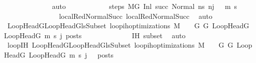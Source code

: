 \begin{isabellebody}
\ \ \ \ \ \ \ \ \ \ \ \ \isamarkupfalse%
\ auto\isanewline
\ \ \ \ \ \ \ \ \ \ \isamarkupfalse%
\ steps{\isacharcolon}{\kern0pt}\ {\isachardoublequoteopen}M{\isacharcomma}{\kern0pt}{\isasymLambda}{\isacharcomma}{\kern0pt}{\isasymGamma}{\isacharcomma}{\kern0pt}{\isasymOmega}{\isacharcomma}{\kern0pt}G\ {\isasymturnstile}{\isacharparenleft}{\kern0pt}Inl\ succ{\isacharcomma}{\kern0pt}\ Normal\ ns{\isacharprime}{\kern0pt}{\isacharparenright}{\kern0pt}\ {\isacharminus}{\kern0pt}n{\isasymrightarrow}{\isacharcircum}{\kern0pt}{\isacharparenleft}{\kern0pt}j\ {\isacharminus}{\kern0pt}\ {}{\isacharparenright}{\kern0pt}\ {\isacharparenleft}{\kern0pt}m{\isacharprime}{\kern0pt}{\isacharcomma}{\kern0pt}\ s{\isacharprime}{\kern0pt}{\isacharparenright}{\kern0pt}{\isachardoublequoteclose}\isanewline
\ \ \ \ \ \ \ \ \ \ \ \ \isamarkupfalse%
\ {\isachardoublequoteopen}{}{\isachardoublequoteclose}{\isacharparenleft}{\kern0pt}{}{\isacharparenright}{\kern0pt}\ {\isachardoublequoteopen}{}{\isachardoublequoteclose}{\isacharparenleft}{\kern0pt}{}{\isacharparenright}{\kern0pt}\ local{\isachardot}{\kern0pt}RedNormalSucc{\isacharparenleft}{\kern0pt}{}{\isacharparenright}{\kern0pt}\ local{\isachardot}{\kern0pt}RedNormalSucc{\isacharparenleft}{\kern0pt}{}{\isacharparenright}{\kern0pt}\ \isamarkupfalse%
\ auto\isanewline
\ \ \ \ \ \ \ \ \ \ \isamarkupfalse%
\ {\isachardoublequoteopen}{\isasymforall}{\isacharparenleft}{\kern0pt}LoopHeadG{\isacharcomma}{\kern0pt}LoopHeadG{\isacharprime}{\kern0pt}{\isacharparenright}{\kern0pt}{\isasymin}lsSubset{\isachardot}{\kern0pt}\ loop{\isacharunderscore}{\kern0pt}ih{\isacharunderscore}{\kern0pt}optimizations\ M\ {\isasymLambda}\ {\isasymGamma}\ {\isasymOmega}\ G\ G{\isacharprime}{\kern0pt}\ LoopHeadG\ LoopHeadG{\isacharprime}{\kern0pt}\ m{\isacharprime}{\kern0pt}\ s{\isacharprime}{\kern0pt}\ j\ posts{\isachardoublequoteclose}\isanewline
\ \ \ \ \ \ \ \ \ \ \ \ \isamarkupfalse%
\ IH\ subset\ \isamarkupfalse%
\ auto\isanewline
\ \ \ \ \ \ \ \ \ \ \isamarkupfalse%
\ loopIH{\isacharcolon}{\kern0pt}\ {\isachardoublequoteopen}{\isasymforall}{\isacharparenleft}{\kern0pt}LoopHeadG{\isacharcomma}{\kern0pt}LoopHeadG{\isacharprime}{\kern0pt}{\isacharparenright}{\kern0pt}{\isasymin}lsSubset{\isachardot}{\kern0pt}\ loop{\isacharunderscore}{\kern0pt}ih{\isacharunderscore}{\kern0pt}optimizations\ M\ {\isasymLambda}\ {\isasymGamma}\ {\isasymOmega}\ G\ G{\isacharprime}{\kern0pt}\ LoopHeadG\ LoopHeadG{\isacharprime}{\kern0pt}\ m{\isacharprime}{\kern0pt}\ s{\isacharprime}{\kern0pt}\ {\isacharparenleft}{\kern0pt}j\ {\isacharminus}{\kern0pt}\ {}{\isacharparenright}{\kern0pt}\ posts{\isachardoublequoteclose}\isanewline

\end{isabellebody}
